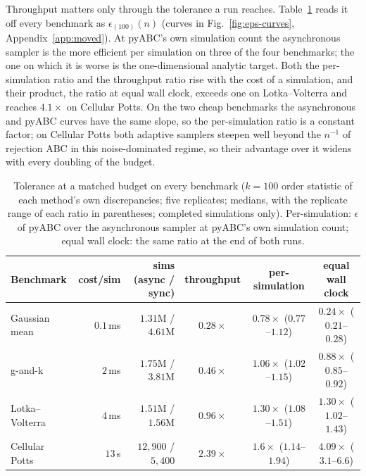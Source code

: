 \documentclass[10pt]{article}
\theoremstyle{plain}
\theoremstyle{definition}
\begin{document}
Throughput matters only through the tolerance a run reaches. Table~\ref{tab:matched-eps} reads it off every benchmark as $\epsilon_{(100)}(n)$ (curves in Fig.~\ref{fig:eps-curves}, Appendix~\ref{app:moved}). At pyABC's own simulation count the asynchronous sampler is the more efficient per simulation on three of the four benchmarks; the one on which it is worse is the one-dimensional analytic target. Both the per-simulation ratio and the throughput ratio rise with the cost of a simulation, and their product, the ratio at equal wall clock, exceeds one on Lotka--Volterra and reaches $4.1\times$ on Cellular Potts. On the two cheap benchmarks the asynchronous and pyABC curves have the same slope, so the per-simulation ratio is a constant factor; on Cellular Potts both adaptive samplers steepen well beyond the $n^{-1}$ of rejection ABC in this noise-dominated regime, so their advantage over it widens with every doubling of the budget.
\begin{table}[t]
\caption{Tolerance at a matched budget on every benchmark ($k=100$ order statistic of each method's own discrepancies; five replicates; medians, with the replicate range of each ratio in parentheses; completed simulations only). Per-simulation: $\epsilon$ of pyABC over the asynchronous sampler at pyABC's own simulation count; equal wall clock: the same ratio at the end of both runs.}\label{tab:matched-eps}
\centering
\footnotesize
\setlength{\tabcolsep}{4pt}
\begin{tabular}{@{}lrrccc@{}}
\toprule
Benchmark & cost/sim & sims (async / sync) & throughput & per-simulation & equal wall clock \\
\midrule
Gaussian mean   & $0.1$\,ms & $1.31$M / $4.61$M & $0.28\times$ & $0.78\times$ ($0.77$--$1.12$) & $0.24\times$ ($0.21$--$0.28$) \\
g-and-k         & $2$\,ms   & $1.75$M / $3.81$M & $0.46\times$ & $1.06\times$ ($1.02$--$1.15$) & $0.88\times$ ($0.85$--$0.92$) \\
Lotka--Volterra & $4$\,ms   & $1.51$M / $1.56$M & $0.96\times$ & $1.30\times$ ($1.08$--$1.51$) & $1.30\times$ ($1.02$--$1.43$) \\
Cellular Potts  & $13$\,s   & $12{,}900$ / $5{,}400$ & $2.39\times$ & $1.6\times$ ($1.14$--$1.94$) & $4.09\times$ ($3.1$--$6.6$) \\
\bottomrule
\end{tabular}
\end{table}
\end{document}
